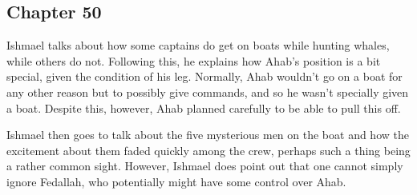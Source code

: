 \subsection{Chapter 50}

Ishmael talks about how some captains do get on boats while hunting whales,
while others do not. Following this, he explains how Ahab's position is a bit
special, given the condition of his leg. Normally, Ahab wouldn't go on a boat
for any other reason but to possibly give commands, and so he wasn't specially
given a boat. Despite this, however, Ahab planned carefully to be able to pull
this off.

Ishmael then goes to talk about the five mysterious men on the boat and how the
excitement about them faded quickly among the crew, perhaps such a thing being
a rather common sight. However, Ishmael does point out that one cannot simply
ignore Fedallah, who potentially might have some control over Ahab.
